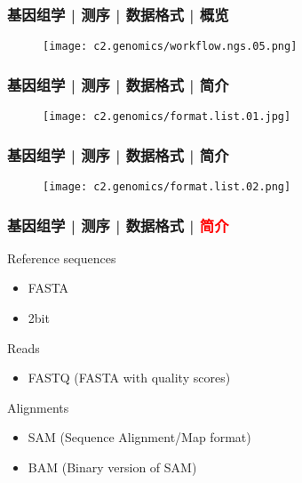 \begin{frame}
  \frametitle{基因组学 | 测序 | 数据格式 | 概览}
  \begin{figure}
    \centering
    \texttt{[image: c2.genomics/workflow.ngs.05.png]}
  \end{figure}
\end{frame}

\begin{frame}
  \frametitle{基因组学 | 测序 | 数据格式 | 简介}
  \begin{figure}
    \centering
    \texttt{[image: c2.genomics/format.list.01.jpg]}
  \end{figure}
\end{frame}
    
\begin{frame}
  \frametitle{基因组学 | 测序 | 数据格式 | 简介}
  \begin{figure}
    \centering
    \texttt{[image: c2.genomics/format.list.02.png]}
  \end{figure}
\end{frame}

\begin{frame}
  \frametitle{基因组学 | 测序 | 数据格式 | \textcolor{red}{简介}}
  \begin{block}{Reference sequences}
    \begin{itemize}
      \item FASTA
      \item 2bit
    \end{itemize}
  \end{block}
  \pause
  \begin{block}{Reads}
    \begin{itemize}
      \item FASTQ (FASTA with quality scores)
    \end{itemize}
  \end{block}
  \pause
  \begin{block}{Alignments}
    \begin{itemize}
      \item SAM (Sequence Alignment/Map format)
      \item BAM (Binary version of SAM)
    \end{itemize}
  \end{block}
\end{frame}
    

